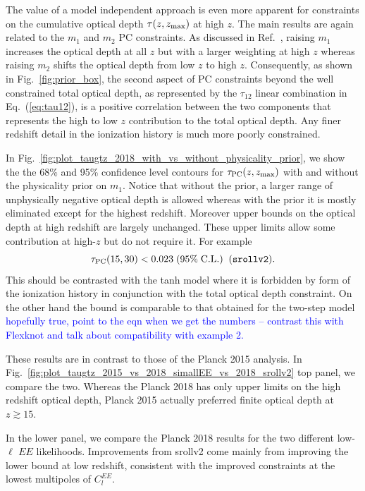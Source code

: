 \documentclass[prd,twocolumn,amsmath,amssymb,floatfix,superscriptaddress,nofootinbib]{revtex4-1}
\newcommand{\zmax}{z_{\rm max}}
\newcommand{\beq}{\begin{equation}}
\newcommand{\eeq}{\end{equation}}
\newcommand{\wh}[1]{\textcolor{blue}{#1}}
\begin{document}
{The value of a model independent approach is even more apparent for constraints on the
cumulative optical depth $\tau(z, \zmax)$ at high $z$.
The main results are again related to the $m_1$ and $m_2$ PC constraints. 
As discussed in Ref.~\cite{Heinrich:2016ojb}, raising $m_1$ increases the  optical depth  at all $z$ but with a larger weighting at high $z$ whereas
raising $m_2$ shifts the optical depth from low $z$ to high $z$.  
Consequently, as shown in Fig.~\ref{fig:prior_box}, the second aspect of PC constraints beyond the well constrained total optical depth, as represented by the $\tau_{12}$ linear combination in Eq.~(\ref{eq:tau12}), is a positive
correlation between the two components that represents the high to low $z$ 
contribution to the total optical depth.  Any finer redshift detail in the ionization history is much more poorly constrained.

In Fig.~\ref{fig:plot_taugtz_2018_with_vs_without_physicality_prior}, we show the 
the 68\% and 95\% confidence level contours for  $\tau_{\rm PC}(z,z_{\rm max})$ with and without the physicality prior on $m_1$.  Notice that without the prior, a larger range of unphysically negative optical depth is allowed whereas with the prior it is mostly eliminated except for the highest redshift.  Moreover upper bounds on the optical depth at high 
redshift are largely unchanged.   These upper limits allow some contribution at high-$z$ but do not require it.   For example
\beq
\tau_{\rm PC}(15, 30) < 0.023 \; (95\%\; \mathrm{C.L.})\;\;(\texttt{srollv2}).
\eeq
This should be contrasted with the tanh model 
 where it is  forbidden by form of the ionization history in conjunction with the total optical depth constraint.  
 On the other hand the bound is comparable to that obtained for the two-step model 
 \wh{hopefully true, point to the eqn when we get the numbers -- contrast this with Flexknot and talk about compatibility with example 2.}
 
These results are in contrast to those of the Planck 2015 analysis. 
In Fig.~\ref{fig:plot_taugtz_2015_vs_2018_simallEE_vs_2018_srollv2} top panel, we compare
the two.  Whereas the Planck 2018 has only upper limits on the high redshift optical depth, Planck 2015 actually preferred
finite optical depth at $z\gtrsim 15$.

In the lower panel, we compare the Planck 2018 results for the two different low-$\ell$ $EE$ likelihoods.  Improvements from srollv2 come mainly from improving the lower bound at low redshift, consistent with the improved constraints at the lowest multipoles of $C_l^{EE}$.

}
\end{document}
